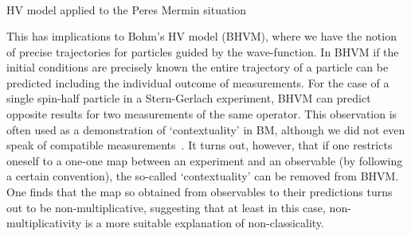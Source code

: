 \documentclass[british,aps,prl,superscriptaddress,nofootinbib,times,reprint]{revtex4-1}
\theoremstyle{plain}
\theoremstyle{plain}
\theoremstyle{definition}
\theoremstyle{remark}
\theoremstyle{remark}
\theoremstyle{remark}
\theoremstyle{plain}
\theoremstyle{plain}
\theoremstyle{plain}
\theoremstyle{definition}
\theoremstyle{definition}
\begin{document}
\begin{table}
\begin{equation*}
\begin{array}{ccc}

\label{eq:toyModel}
\end{array}
\end{equation*}
\caption{HV model applied to the Peres Mermin situation}
\label{tbl:HVmodel}
\end{table}
This has implications to Bohm's HV model (BHVM),
where we have the notion of precise trajectories
for particles guided by the wave-function.  In BHVM
if the initial conditions are precisely known the
entire trajectory of a particle can be predicted
including the individual outcome of measurements.
For the case of a single spin-half particle in a
Stern-Gerlach experiment, BHVM can predict
opposite results for two measurements of the
same operator.  This observation is often used as
a demonstration of `contextuality' in BM, although
we did not even speak of compatible
measurements~\cite{HardyCntxBM}.  It turns out, however,
that if one restricts oneself to a one-one map
between an experiment and an observable (by
following a certain convention), the so-called
`contextuality' can be removed from BHVM.  One
finds that the map so obtained from observables to
their predictions turns out to be
non-multiplicative, suggesting that at least in
this case, non-multiplicativity is a more suitable
explanation of non-classicality.
\end{document}
